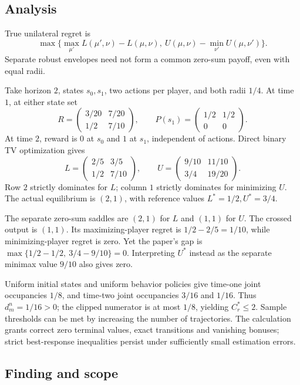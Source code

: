 \documentclass[11pt]{article}
\begin{document}
\subsection*{Analysis}

True unilateral regret is \[\max\{\max_{\mu'}L(\mu',\nu)-L(\mu,\nu),\ U(\mu,\nu)-\min_{\nu'}U(\mu,\nu')\}.\] Separate robust envelopes need not form a common zero-sum payoff, even with equal radii.

Take horizon \(2\), states \(s_0,s_1\), two actions per player, and both radii \(1/4\). At time \(1\), at either state set \[R=\begin{pmatrix}3/20&7/20\\1/2&7/10\end{pmatrix},\qquad P(s_1)=\begin{pmatrix}1/2&1/2\\0&0\end{pmatrix}.\] At time \(2\), reward is \(0\) at \(s_0\) and \(1\) at \(s_1\), independent of actions. Direct binary TV optimization gives \[L=\begin{pmatrix}2/5&3/5\\1/2&7/10\end{pmatrix},\qquad U=\begin{pmatrix}9/10&11/10\\3/4&19/20\end{pmatrix}.\] Row \(2\) strictly dominates for \(L\); column \(1\) strictly dominates for minimizing \(U\). The actual equilibrium is \((2,1)\), with reference values \(L^*=1/2,U^*=3/4\).

The separate zero-sum saddles are \((2,1)\) for \(L\) and \((1,1)\) for \(U\). The crossed output is \((1,1)\). Its maximizing-player regret is \(1/2-2/5=1/10\), while minimizing-player regret is zero. Yet the paper’s gap is \(\max\{1/2-1/2,\ 3/4-9/10\}=0\). Interpreting \(U^*\) instead as the separate minimax value \(9/10\) also gives zero.

Uniform initial states and uniform behavior policies give time-one joint occupancies \(1/8\), and time-two joint occupancies \(3/16\) and \(1/16\). Thus \(d_m^n=1/16>0\); the clipped numerator is at most \(1/8\), yielding \(C_r^*\le2\). Sample thresholds can be met by increasing the number of trajectories. The calculation grants correct zero terminal values, exact transitions and vanishing bonuses; strict best-response inequalities persist under sufficiently small estimation errors.

\subsection*{Finding and scope}
\end{document}
